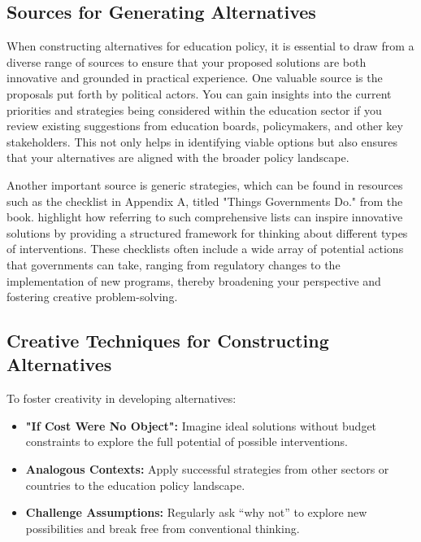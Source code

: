 \documentclass{article}
\theoremstyle{definition}
\theoremstyle{plain}
\begin{document}
\subsection{Sources for Generating Alternatives}

When constructing alternatives for education policy, it is essential to draw
from a diverse range of sources to ensure that your proposed solutions are both
innovative and grounded in practical experience. One valuable source is the
proposals put forth by political actors. You can gain
insights into the current priorities and strategies being considered within the
education sector if you review existing suggestions from
education boards, policymakers, and other key stakeholders. 
This not only helps in identifying viable options but also
ensures that your alternatives are aligned with the broader policy landscape. 

Another important source is generic strategies, which can be found in resources
such as the checklist in Appendix A, titled "Things Governments Do." from the
book.  \citet{Bardach2020} highlight how referring to such comprehensive lists can inspire
innovative solutions by providing a structured framework for thinking about
different types of interventions. These checklists often include a wide array of
potential actions that governments can take, ranging from regulatory changes to
the implementation of new programs, thereby broadening your perspective and
fostering creative problem-solving. 

\subsection{Creative Techniques for Constructing Alternatives}

To foster creativity in developing alternatives:

\begin{itemize}
    \item \textbf{"If Cost Were No Object":} Imagine ideal solutions without budget constraints to explore the full potential of possible interventions.
    
    \item \textbf{Analogous Contexts:} Apply successful strategies from other sectors or countries to the education policy landscape.
    
    \item \textbf{Challenge Assumptions:} Regularly ask “why not” to explore new possibilities and break free from conventional thinking.
\end{itemize}
\end{document}
